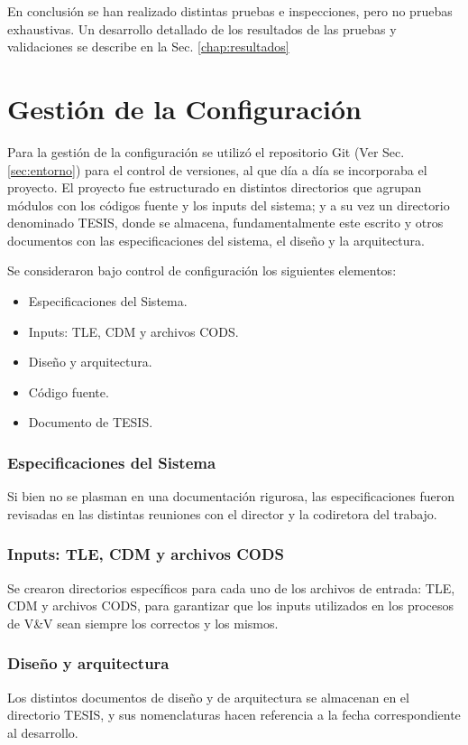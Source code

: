 En conclusi\'on se han realizado distintas pruebas e inspecciones, pero no pruebas exhaustivas.
Un desarrollo detallado de los resultados de las pruebas y validaciones se describe en la Sec. \ref{chap:resultados}\\

\section{Gesti\'on de la Configuraci\'on}

Para la gesti\'on de la configuraci\'on se utiliz\'o el repositorio Git (Ver Sec. \ref{sec:entorno}) para el control de versiones, al que d\'ia a d\'ia se incorporaba el proyecto. El proyecto fue estructurado en distintos directorios que agrupan m\'odulos con los c\'odigos fuente y los inputs del sistema; y a su vez un directorio denominado TESIS, donde se almacena, fundamentalmente este escrito y otros documentos con las especificaciones del sistema, el dise\~no y la arquitectura.  

Se consideraron bajo control de configuraci\'on los siguientes elementos:

\begin{itemize}
 \item Especificaciones del Sistema.
 \item Inputs: TLE, CDM y archivos CODS.
 \item Dise\~no y arquitectura.
 \item C\'odigo fuente.
 \item Documento de TESIS.
\end{itemize}

\subsubsection*{Especificaciones del Sistema}
Si bien no se plasman en una documentaci\'on rigurosa, las especificaciones fueron revisadas en las distintas reuniones con el director y la codiretora del trabajo.

\subsubsection*{Inputs: TLE, CDM y archivos CODS}
Se crearon directorios espec\'ificos para cada uno de los archivos de entrada: TLE, CDM y archivos CODS, para garantizar que los inputs utilizados en los procesos de V\&V sean siempre los correctos y los mismos. 

\subsubsection*{Dise\~no y arquitectura}
Los distintos documentos de dise\~no y de arquitectura se almacenan en el directorio TESIS, y sus nomenclaturas hacen referencia a la fecha correspondiente al desarrollo. 

